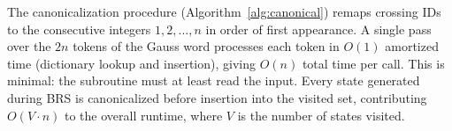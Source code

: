 
The canonicalization procedure (Algorithm~\ref{alg:canonical}) remaps
crossing IDs to the consecutive integers $1,2,\dots,n$ in order of first
appearance.  A single pass over the $2n$ tokens of the Gauss word processes
each token in $O(1)$ amortized time (dictionary lookup and insertion),
giving $O(n)$ total time per call.  This is minimal: the subroutine must at
least read the input.  Every state generated during BRS is canonicalized
before insertion into the visited set, contributing $O(V \cdot n)$ to the
overall runtime, where $V$ is the number of states visited.
